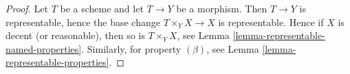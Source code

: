 \documentclass{stacks-project}
\theoremstyle{plain}
\theoremstyle{definition}
\theoremstyle{remark}
\numberwithin{equation}{subsection}
\begin{document}
\begin{proof}
Let $T$ be a scheme and let $T \to Y$ be a morphism. Then $T \to Y$
is representable, hence the base change $T \times_Y X \to X$ is representable.
Hence if $X$ is decent (or reasonable), then so is $T \times_Y X$, see
Lemma \ref{lemma-representable-named-properties}.
Similarly, for property $(\beta)$, see
Lemma \ref{lemma-representable-properties}.
\end{proof}
\end{document}
